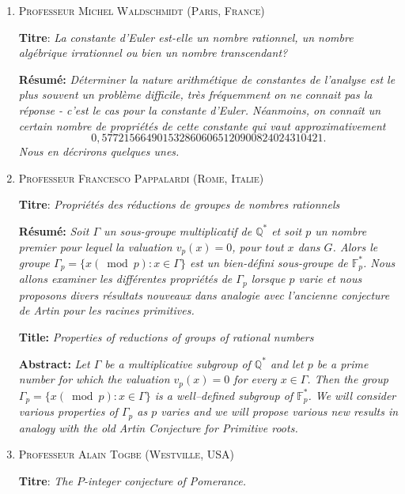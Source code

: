 \documentclass[a4paper,10pt]{article}
\begin{document}
\begin{enumerate}
\item \textsc{Professeur Michel Waldschmidt (Paris, France)}\medskip

\textbf{Titre}: \textit{La constante d'Euler est-elle un nombre rationnel, un nombre alg\'ebrique irrationnel ou bien un nombre transcendant?}

\textbf{R\'esum\'e:} 
\textit{D\'eterminer la nature arithm\'etique de constantes de l'analyse est le plus souvent un probl\`eme difficile, 
tr\`es fr\'equemment on ne connait pas la r\'eponse - c'est le cas pour la constante d'Euler. 
N\'eanmoins, on connaît un certain nombre de propri\'et\'es de cette constante qui vaut approximativement
$$0, 577 215 664 901 532 860 606 512 090 082 402 431 042 1. $$
Nous en d\'ecrirons quelques unes.}\bigskip

\item \textsc{Professeur Francesco Pappalardi (Rome, Italie)} \medskip

\textbf{Titre}: \textit{Propri\'et\'es des r\'eductions de groupes de nombres rationnels}

\textbf{R\'esum\'e:} \textit{Soit $\Gamma$ un sous-groupe multiplicatif de $\mathbb Q^*$ et soit $p$ un nombre 
premier pour lequel la valuation $v_p(x) =  0$, pour tout $x$ dans $G$. Alors le groupe 
$\Gamma_p = \{x (\bmod p): x\in \Gamma\}$ est un bien-d\'efini sous-groupe de $\mathbb F_p^*$. 
Nous allons examiner les diff\'erentes propri\'et\'es de $\Gamma_p$ lorsque $p$ varie 
et nous proposons divers r\'esultats nouveaux dans analogie avec  l'ancienne conjecture de Artin pour les racines primitives.}\medskip

\textbf{Title:} \textit{Properties of reductions of groups of rational numbers}

\textbf{Abstract:} \textit{Let $\Gamma$ be a multiplicative subgroup of $\mathbb Q^*$ and let $p$ be a prime number for 
which the valuation $v_p(x)=0$ for every $x\in\Gamma$. Then the group $\Gamma_p =\{x (\bmod p) : x  \in \Gamma\}$ is a 
well--defined subgroup of $\mathbb F_p^*$. We will consider various properties of $\Gamma_p$ as $p$ 
varies and we will propose various new results in analogy with the old Artin Conjecture for Primitive roots.}
\bigskip

\item \textsc{Professeur Alain Togbe (Westville, USA)} \medskip

\textbf{Titre}: \textit{The $P$-integer conjecture of Pomerance.}


\end{enumerate}
\end{document}
